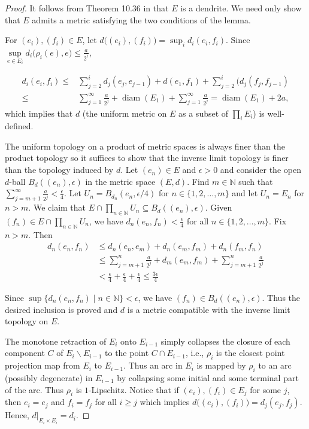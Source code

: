 \documentclass[11pt, leqno]{amsart}
\theoremstyle{definition}\newtheorem{definition}[theorem]{Definition}
\newcommand {\diam}{\operatorname{diam}}
\begin{document}
\begin{proof}
    It follows from Theorem 10.36 in \cite{Nadler1992} that $E$ is a dendrite.  We need only show that $E$ admits a metric satisfying the two conditions of the lemma.

    For $(e_i), (f_i)\in E $, let  $d\big((e_i), (f_i)\big) = \sup_i d_i(e_i, f_i)$.  Since $\sup\limits_{e\in E_i}d_i\big(\rho_i(e), e\big)\leq \frac{a}{2^i}$,

    \begin{align*}
        d_i(e_i, f_i) \leq& \sum\limits^{i}_{j=2}d_j(e_j, e_{j-1}) + d(e_1, f_1)+ \sum\limits^{i}_{j=2} \big( d_j(f_j, f_{j-1})  \\
        \leq & \sum\limits_{j=1}^\infty \frac{a}{2^j} + \diam(E_1) + \sum\limits_{j=1}^\infty \frac{a}{2^j} = \diam(E_1)+2a,
    \end{align*} which implies that $d$ (the uniform metric on $E$ as a subset of $\prod_i E_i$) is well-defined.

     The uniform topology on a product of metric spaces is always finer than the product topology so it suffices to show that the inverse limit topology is finer than the topology induced by $d$. Let $(e_n)\in E$ and $\epsilon>0$ and consider the open $d$-ball $B_{d}((e_n),\epsilon)$ in the metric space $(E,d)$. Find $m\in\mathbb N$ such that $\sum_{j=m+1}^{\infty}\frac{a}{2^j}<\frac{\epsilon}{4}$. Let $U_n=B_{d_n}(e_n,\epsilon/4)$ for $n\in\{1,2,\dots, m\}$ and let $U_n=E_n$ for $n>m$. We claim that $E\cap \prod_{n\in\mathbb N}U_n\subseteq B_{d}((e_n),\epsilon)$. Given $(f_n)\in E\cap \prod_{n\in\mathbb N}U_n$, we have $d_n(e_n,f_n)<\frac{\epsilon}{4}$ for all $n\in\{1,2,\dots,m\}$. Fix $n>m$. Then
    \begin{align*}
        d_n(e_n,f_n) &\leq  d_n(e_n,e_m)+d_n(e_m,f_m)+d_n(f_m,f_n)\\
                    &\leq  \sum_{j=m+1}^{n}\frac{a}{2^{j}}+d_m(e_m,f_m)+\sum_{j=m+1}^{n}\frac{a}{2^{j}}\\
                    & < \frac{\epsilon}{4}+\frac{\epsilon}{4}+\frac{\epsilon}{4}\leq \frac{3\epsilon}{4}
    \end{align*}

    Since $\sup\{d_n(e_n,f_n)\mid n\in\mathbb N\}<\epsilon$, we have $(f_n)\in B_{d}((e_n),\epsilon)$. Thus the desired inclusion is proved and $d$ is a metric compatible with the inverse limit topology on $E$.

     The monotone retraction of $E_i$ onto $E_{i-1}$ simply collapses the closure of each component $C$ of $E_i\backslash E_{i-1}$ to the point $C\cap E_{i-1}$, i.e., $\rho_i$ is the closest point projection map from $E_i$ to $E_{i-1}$.  Thus an arc in $E_i$ is mapped by $\rho_i$ to an arc (possibly degenerate) in $E_{i-1}$ by collapsing some initial and some terminal part of the arc.  Thus $\rho_i$ is $1$-Lipschitz. Notice that if $(e_i), (f_i)\in E_j$ for some $j$, then $e_i = e_j$ and $f_i= f_j$ for all $i\geq j$ which implies $d\big((e_i), (f_i)\big) = d_j(e_j, f_j)$.  Hence, $d|_{E_i\times E_i}= d_i$.


\end{proof}
\end{document}
